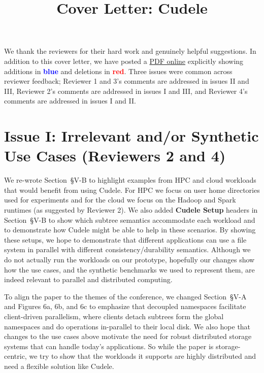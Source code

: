 \documentclass[onecolumn,conference]{IEEEtran}
\begin{document}
\title{Cover Letter: Cudele}
\maketitle

We thank the reviewers for their hard work and genuinely helpful suggestions.
In addition to this cover letter, we have posted a
\href{https://github.com/michaelsevilla/cudele-popper/blob/master/paper/diff.pdf}{PDF
online} explicitly showing additions in \textcolor{blue}{\textbf{blue}} and
deletions in \textcolor{red}{\textbf{red}}. Three issues were common across
reviewer feedback; Reviewer 1 and 3's comments are addressed in issues II and
III, Reviewer 2's comments are addressed in issues I and III, and Reviewer 4's
comments are addressed in issues I and II. 

\section*{Issue I: Irrelevant and/or Synthetic Use Cases (Reviewers 2 and 4)}

We re-wrote Section~{\S}V-B to highlight examples from HPC and cloud workloads
that would benefit from using Cudele. For HPC we focus on user home directories
used for experiments and for the cloud we focus on the Hadoop and Spark
runtimes (as suggested by Reviewer 2).  We also added \textbf{Cudele Setup}
headers in Section~{\S}V-B to show which subtree semantics accommodate each
workload and to demonstrate how Cudele might be able to help in these
scenarios.  By showing these setups, we hope to demonstrate that different
applications can use a file system in parallel with different
consistency/durability semantics.  Although we do not actually run the
workloads on our prototype, hopefully our changes show how the use cases, and
the synthetic benchmarks we used to represent them, are indeed relevant to
parallel and distributed computing.

To align the paper to the themes of the conference, we changed Section~{\S}V-A
and Figures 6a, 6b, and 6c to emphasize that decoupled namespaces facilitate
client-driven parallelism, where clients detach subtrees form the global namespaces
and do operations in-parallel to their local disk. We also hope that changes to
the use cases above motivate the need for robust distributed storage systems
that can handle today's applications.  So while the paper is storage-centric,
we try to show that the workloads it supports are highly distributed and need a
flexible solution like Cudele.  
\end{document}

